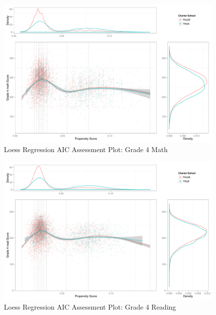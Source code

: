 \begin{figure}[h!]
\begin{center}
\includegraphics[height=.4\textheight]{../Figures2009/g4math-loessAIC.pdf}
\caption{Loess Regression AIC Assessment Plot: Grade 4 Math}
\label{fig:g4math:loessAIC}
\end{center}
\end{figure}

\begin{figure}[h!]
\begin{center}
\includegraphics[height=.4\textheight]{../Figures2009/g4read-loessAIC.pdf}
\caption{Loess Regression AIC Assessment Plot: Grade 4 Reading}
\label{fig:g4read:loess}
\end{center}
\end{figure}

